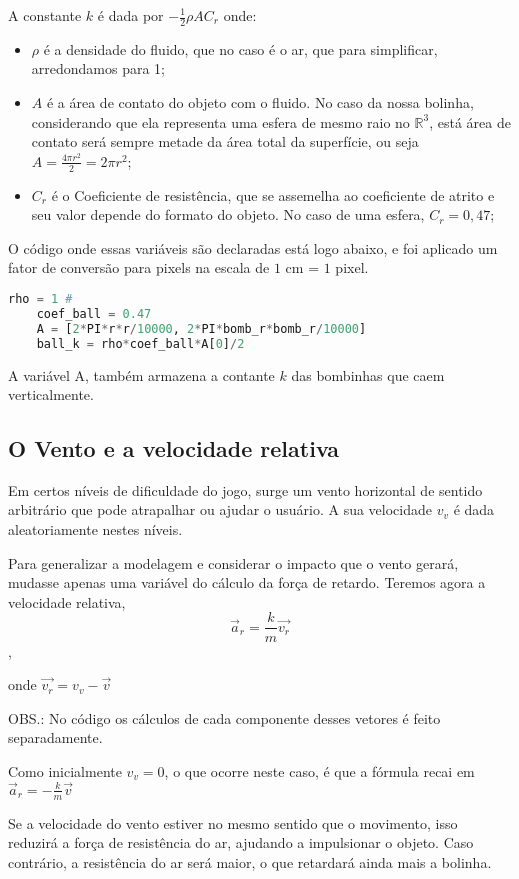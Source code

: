 \documentclass[12pt,letterpaper]{article}
\begin{document}
A constante $k$ é dada por $-\displaystyle\frac12\rho A C_r$ onde:

\begin{itemize}
    \item $\rho$ é a densidade do fluido, que no caso é o ar, que para simplificar, arredondamos para 1;
    \item $A$ é a área de contato do objeto com o fluido. No caso da nossa bolinha, considerando que ela representa uma esfera de mesmo raio no $\mathbb{R}^3$, está área de contato será sempre metade da área total da superfície, ou seja $A=\displaystyle\frac{4\pi r^2}2=2\pi r^2$;
    \item $C_r$ é o Coeficiente de resistência, que se assemelha ao coeficiente de atrito e seu valor depende do formato do objeto. No caso de uma esfera, $C_r=0,47$;
    
\end{itemize}
O código onde essas variáveis são declaradas está logo abaixo, e foi aplicado um fator de conversão para pixels na escala de $1$ cm = $1$ pixel.
\begin{lstlisting}[language=Python]
    rho = 1 #
    coef_ball = 0.47
    A = [2*PI*r*r/10000, 2*PI*bomb_r*bomb_r/10000]
    ball_k = rho*coef_ball*A[0]/2
\end{lstlisting}

A variável A, também armazena a contante $k$ das bombinhas que caem verticalmente.

\subsection*{O Vento e a velocidade relativa}

Em certos níveis de dificuldade do jogo, surge um vento horizontal de sentido arbitrário que pode atrapalhar ou ajudar o usuário. A sua velocidade $v_v$ é dada aleatoriamente nestes níveis.

Para generalizar a modelagem e considerar o impacto que o vento gerará, mudasse apenas uma variável do cálculo da força de retardo. Teremos agora a velocidade relativa,
$$\vec{a}_r=\displaystyle\frac k m\vec{v_r}$$,

onde $\vec{v_r}=v_v-\vec{v}$

OBS.: No código os cálculos de cada componente desses vetores é feito separadamente.

Como inicialmente $v_v=0$, o que ocorre neste caso, é que a fórmula recai em $\vec{a}_r=-\displaystyle\frac k m\vec{v}$

Se a velocidade do vento estiver no mesmo sentido que o movimento, isso reduzirá a força de resistência do ar, ajudando a impulsionar o objeto.
Caso contrário, a resistência do ar será maior, o que retardará ainda mais a bolinha.
\end{document}
